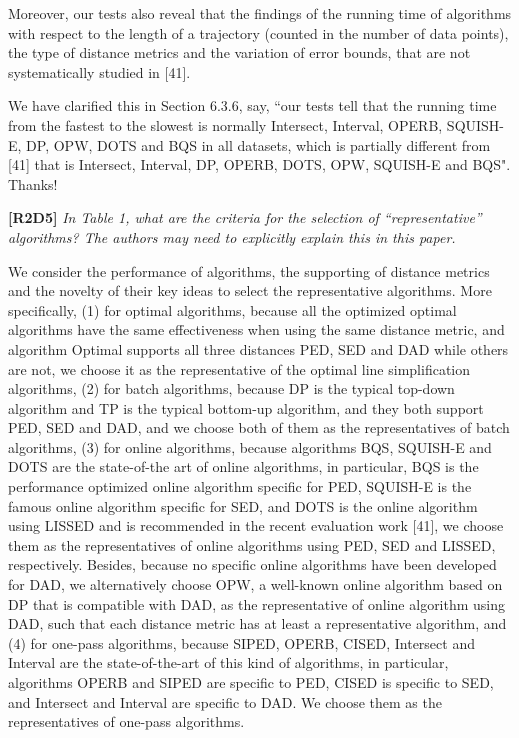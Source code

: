 \documentclass{letter}
\begin{document}
Moreover, our tests also reveal that the findings of the running time of algorithms with respect to the length of a trajectory (counted in the number of data points), the type of distance metrics and the variation of error bounds, that are not systematically studied in [41].



We have clarified this in Section 6.3.6, say, ``our tests tell that the running time from the fastest to the slowest is normally Intersect, Interval, OPERB, SQUISH-E, DP, OPW, DOTS and BQS in all datasets, which is partially different from [41] that is Intersect, Interval, DP, OPERB, DOTS, OPW, SQUISH-E and BQS". Thanks!




\textbf{[R2D5]} \emph{In Table 1, what are the criteria for the selection of ``representative'' algorithms? The authors may need to explicitly explain this in this paper.}

We consider the performance of algorithms, the supporting of distance metrics and the novelty of their key ideas to select the representative algorithms. More specifically,
(1) for optimal algorithms, {because all the optimized optimal algorithms have the same effectiveness when using the same distance metric, and algorithm Optimal supports all three distances PED, SED and DAD while others are not, we choose it as the representative of the optimal line simplification algorithms,}
%
(2) for batch algorithms, {because DP is the typical top-down algorithm and TP is the typical bottom-up algorithm, and they both support PED, SED and DAD, and we choose  both of them as the representatives of batch algorithms,}
%
(3) for online algorithms, because algorithms BQS, SQUISH-E and DOTS are the state-of-the art of online algorithms, in particular, BQS is the performance optimized online algorithm specific for PED, SQUISH-E is the famous online algorithm specific for SED, and {DOTS is the online algorithm using LISSED and is recommended in the recent evaluation work [41]}, we choose them as the representatives of online algorithms using PED, SED and {LISSED}, respectively. Besides, because no specific online algorithms have been developed for DAD, we alternatively choose OPW, a well-known online algorithm based on DP that is compatible with DAD, as the representative of online algorithm using DAD, such that each distance metric has at least a representative algorithm, and
%
(4) for one-pass algorithms, because SIPED, OPERB, CISED, Intersect and Interval are the state-of-the-art of this kind of algorithms, in particular, algorithms OPERB and SIPED are specific to PED, CISED is specific to SED, and Intersect and Interval are specific to DAD. We choose them as the representatives of one-pass algorithms.
\end{document}

